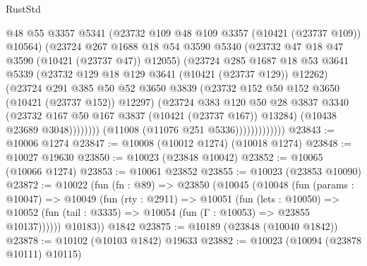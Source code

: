 \begin{lexlean}{RustStd}
\begin{coremodule}
                                @48
                                @55
                                @3357
                                @5341
                                (@23732 @109 @48 @109 @3357 (@10421 (@23737 @109)) @10564)
                                (@23724
                                  @267
                                  @1688
                                  @18
                                  @54
                                  @3590
                                  @5340
                                  (@23732 @47 @18 @47 @3590 (@10421 (@23737 @47)) @12055)
                                  (@23724
                                    @285
                                    @1687
                                    @18
                                    @53
                                    @3641
                                    @5339
                                    (@23732 @129 @18 @129 @3641 (@10421 (@23737 @129)) @12262)
                                    (@23724
                                      @291
                                      @385
                                      @50
                                      @52
                                      @3650
                                      @3839
                                      (@23732 @152 @50 @152 @3650 (@10421 (@23737 @152)) @12297)
                                      (@23724
                                        @383
                                        @120
                                        @50
                                        @28
                                        @3837
                                        @3340
                                        (@23732 @167 @50 @167 @3837 (@10421 (@23737 @167)) @13284)
                                        (@10438 @23689 @3048))))))))
                          (@11008 (@11076 @251 @5336)))))))))))))
@23843 := @10006 @1274
@23847 := @10008 (@10012 @1274) (@10018 @1274)
@23848 := @10027 @19630
@23850 := @10023 (@23848 @10042)
@23852 := @10065 (@10066 @1274)
@23853 := @10061 @23852
@23855 := @10023 (@23853 @10090)
@23872 := @10022
    (fun (fn : @89) =>
    @23850
      (@10045
        (@10048
          (fun (params : @10047) =>
          @10049
            (fun (rty : @2911) =>
            @10051
              (fun (lets : @10050) =>
              @10052 (fun (tail : @3335) => @10054 (fun (Γ : @10053) => @23855 @10137))))))
        @10183))
    @1842
@23875 := @10189 (@23848 (@10040 @1842))
@23878 := @10102 (@10103 @1842) @19633
@23882 := @10023 (@10094 (@23878 @10111) @10115)

\end{coremodule}
\end{lexlean}
